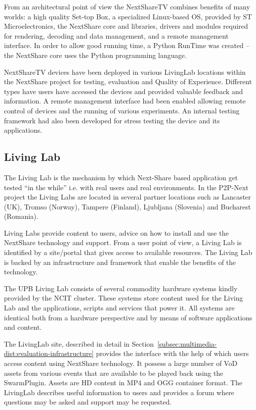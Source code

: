 From an architectural point of view the NextShareTV combines benefits of many
worlds: a high quality Set-top Box, a specialized Linux-based OS, provided by
ST Microelectronics, the NextShare core and libraries, drivers and modules
required for rendering, decoding and data management, and a remote management
interface. In order to allow good running time, a Python RunTime was created
-- the NextShare core uses the Python programming language.

NextShareTV devices have been deployed in various LivingLab locations within
the NextShare project for testing, evaluation and Quality of Experience.
Different types have users have accessed the devices and provided valuable
feedback and information. A remote management interface had been enabled
allowing remote control of devices and the running of various experiments. An
internal testing framework had also been developed for stress testing the
device and its applications.

\subsection{Living Lab}
\label{subsec:multimedia-dist:nextshare-ll}

The Living Lab is the mechanism by which Next-Share based application get
tested ``in the while'' i.e. with real users and real environments. In the
P2P-Next project the Living Labs are located in several partner locations such
as Lancaster (UK), Tromso (Norway), Tampere (Finland), Ljubljana (Slovenia)
and Bucharest (Romania).

Living Labs provide content to users, advice on how to install and use the
NextShare technology and support. From a user point of view, a Living Lab is
identified by a site/portal that gives access to available resources. The
Living Lab is backed by an infrastructure and framework that enable the
benefits of the technology.

The UPB Living Lab consists of several commodity hardware systems kindly
provided by the NCIT cluster. These systems store content used for the Living
Lab and the applications, scripts and services that power it. All systems are
identical both from a hardware perspective and by means of software
applications and content.

The LivingLab site, described in detail in
Section~\ref{subsec:multimedia-dist:evaluation-infrastructure} provides the
interface with the help of which users access content using NextShare
technology. It possess a large number of VoD assets from various events that
are available to be played back using the SwarmPlugin. Assets are HD content
in MP4 and OGG container format. The LivingLab describes useful information to
users and provides a forum where questions may be asked and support may be
requested.

